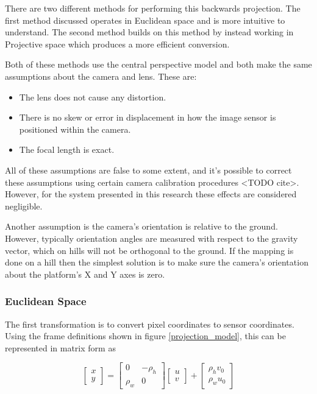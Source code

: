  There are two different methods for performing this backwards projection. The first method discussed operates in Euclidean space and is more intuitive to understand.  The second method builds on this method by instead working in Projective space which produces a more efficient conversion.
 
 Both of these methods use the central perspective model and both make the same assumptions about the camera and lens.  These are:
 \begin{itemize}
 \item The lens does not cause any distortion. 
 \item There is no skew or error in displacement in how the image sensor is positioned within the camera.
 \item The focal length is exact.
 \end{itemize}

 All of these assumptions are false to some extent, and it's possible to correct these assumptions using certain camera calibration procedures <TODO cite>.  However, for the system presented in this research these effects are considered negligible.
   
 Another assumption is the camera's orientation is relative to the ground.  However, typically orientation angles are measured with respect to the gravity vector, which on hills will not be orthogonal to the ground.  If the mapping is done on a hill then the simplest solution is to make sure the camera's orientation about the platform's X and Y axes is zero.
 
 \subsubsection{Euclidean Space}
 
 The first transformation is to convert pixel coordinates to sensor coordinates.  Using the frame definitions shown in figure \ref{projection_model}, this can be represented in matrix form as 
 
\[
\begin{bmatrix} x \\ y \end{bmatrix}
=
\begin{bmatrix} 
 0 & -\rho_h \\
 \rho_w & 0 
\end{bmatrix}
\begin{bmatrix} u \\ v \end{bmatrix}
+
\begin{bmatrix} \rho_h v_0 \\ \rho_w u_0 \end{bmatrix}
\]
 
